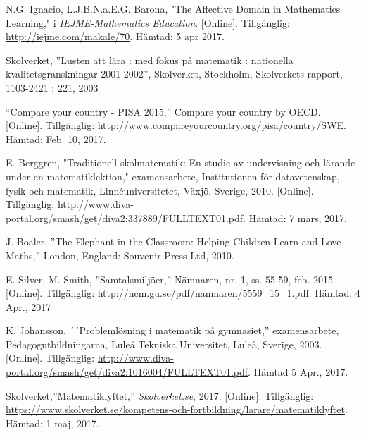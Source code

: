     N.G. Ignacio, L.J.B.N.a.E.G. Barona, "The Affective Domain in Mathematics Learning," i \textsl{IEJME-Mathematics Education}. [Online]. Tillgänglig: \url{http://iejme.com/makale/70}. Hämtad: 5 apr 2017.
    
    Skolverket, ''Lusten att l{\"a}ra : med fokus p{\aa} matematik : nationella kvalitetsgranskningar 2001-2002'',  Skolverket, Stockholm, Skolverkets rapport, 1103-2421 ; 221, 2003
    
   
    
    “Compare your country - PISA 2015,” Compare your country by OECD. [Online]. Tillgänglig: http://www.compareyourcountry.org/pisa/country/SWE. Hämtad: Feb. 10, 2017.
    
    E. Berggren, "Traditionell skolmatematik: En studie av undervisning och lärande under en matematiklektion," examensarbete, Institutionen för datavetenskap, fysik och matematik, Linnéuniversitetet, Växjö, Sverige, 2010. [Online]. Tillgänglig: \url{http://www.diva-portal.org/smash/get/diva2:337889/FULLTEXT01.pdf}. Hämtad: 7 mars, 2017.
    
    J. Boaler, ''The Elephant in the Classroom: Helping Children Learn and Love Maths,'' 
    London,
    England: Souvenir Press Ltd, 
    2010. 
    
    E. Silver, M. Smith, ''Samtalsmiljöer,'' Nämnaren, nr. 1, ss. 55-59, feb. 2015. [Online]. Tillgänglig: \url{http://ncm.gu.se/pdf/namnaren/5559_15_1.pdf}. Hämtad: 4 Apr., 2017
    
    K. Johansson, ´´Problemlösning i matematik på gymnasiet,'' examensarbete, Pedagogutbildningarna, Luleå Tekniska Universitet, Luleå, Sverige, 2003. [Online]. Tillgänglig: \url{http://www.diva-portal.org/smash/get/diva2:1016004/FULLTEXT01.pdf}. Hämtad 5 Apr., 2017.
    
    Skolverket,''Matematiklyftet,'' \textsl{Skolverket.se}, 2017. [Online]. Tillgänglig: \url{https://www.skolverket.se/kompetens-och-fortbildning/larare/matematiklyftet}. Hämtad: 1 maj, 2017.
    
